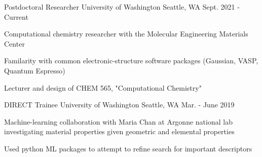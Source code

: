 

\begin{cventries}

 \cventry
   {Postdoctoral Researcher} %
   {University of Washington} %
   {Seattle, WA} %
   {Sept. 2021 - Current} %
   {
     \begin{cvitems} %
       \item {Computational chemistry researcher with the Molecular Engineering Materials Center}
       \item {Familarity with common electronic-structure software packages (Gaussian, VASP, Quantum Espresso)}
       \item {Lecturer and design of CHEM 565, "Computational Chemistry"}
     \end{cvitems}
   }


 \cventry
   {DIRECT Trainee} %
   {University of Washington} %
   {Seattle, WA} %
   {Mar. - June 2019} %
   {
     \begin{cvitems} %
       \item {Machine-learning collaboration with Maria Chan at Argonne national lab investigating material properties given geometric and elemental properties}
       \item {Used python ML packages to attempt to refine search for important descriptors}
     \end{cvitems}
   }



\end{cventries}
